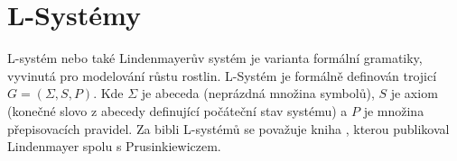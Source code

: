 \documentclass[thesis=B, czech]{FITthesis}[2019/03/06]
\begin{document}




\section{L-Systémy}


L-systém nebo také Lindenmayerův systém je varianta formální gramatiky, vyvinutá pro modelování růstu rostlin. L-Systém je formálně definován trojicí $G=(\Sigma, S, P)$. Kde  $\Sigma$ je abeceda (neprázdná množina symbolů), $S$ je axiom (konečné slovo z abecedy definující počáteční stav systému) a $P$ je množina přepisovacích pravidel. Za bibli L-systémů se považuje kniha \cite{Lsys}, kterou publikoval Lindenmayer spolu s Prusinkiewiczem.


\end{document}

